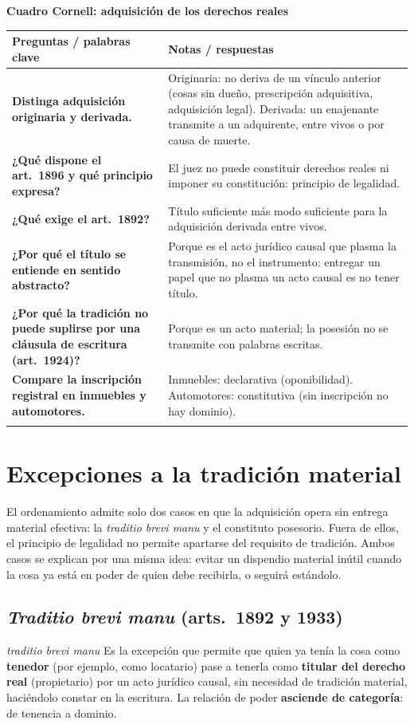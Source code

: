 \documentclass[12pt,oneside]{book}
\renewcommand{\arraystretch}{1.25}
\newcommand{\cq}[2]{\textbf{#1} & #2 \\[0.45em]}
\newcommand{\cornell}[3]{%
\par\bigskip\noindent\textbf{\large Cuadro Cornell: #1}\par\smallskip
\begin{center}
\small
\renewcommand{\arraystretch}{1.15}
\begin{tabularx}{\textwidth}{>{\raggedright\arraybackslash}p{0.27\textwidth}>{\raggedright\arraybackslash}X}
\toprule
\textbf{Preguntas / palabras clave} & \textbf{Notas / respuestas} \\
\midrule
#2
\midrule
\multicolumn{2}{p{\dimexpr\textwidth-2\tabcolsep\relax}}{\textbf{Resumen.} #3} \\
\bottomrule
\end{tabularx}
\end{center}
}
\begin{document}
\cornell{adquisición de los derechos reales}{
\cq{Distinga adquisición originaria y derivada.}{Originaria: no deriva de un vínculo anterior (cosas sin dueño, prescripción adquisitiva, adquisición legal). Derivada: un enajenante transmite a un adquirente, entre vivos o por causa de muerte.}
\cq{¿Qué dispone el art.~1896 y qué principio expresa?}{El juez no puede constituir derechos reales ni imponer su constitución: principio de legalidad.}
\cq{¿Qué exige el art.~1892?}{Título suficiente más modo suficiente para la adquisición derivada entre vivos.}
\cq{¿Por qué el título se entiende en sentido abstracto?}{Porque es el acto jurídico causal que plasma la transmisión, no el instrumento: entregar un papel que no plasma un acto causal es no tener título.}
\cq{¿Por qué la tradición no puede suplirse por una cláusula de escritura (art.~1924)?}{Porque es un acto material; la posesión no se transmite con palabras escritas.}
\cq{Compare la inscripción registral en inmuebles y automotores.}{Inmuebles: declarativa (oponibilidad). Automotores: constitutiva (sin inscripción no hay dominio).}
}{El derecho real se adquiere por vía originaria o derivada. En la derivada entre vivos rige la teoría del título y modo (art.~1892): acto jurídico causal válido más tradición material, que no puede suplirse por fórmulas escritas. La inscripción es declarativa en inmuebles y constitutiva en automotores.}

\chapter[Excepciones a la tradición material]{Excepciones a la tradición material}\label{cap:brevi}

El ordenamiento admite solo dos casos en que la adquisición opera sin entrega material efectiva: la \textit{traditio brevi manu} y el constituto posesorio. Fuera de ellos, el principio de legalidad no permite apartarse del requisito de tradición. Ambos casos se explican por una misma idea: evitar un dispendio material inútil cuando la cosa ya está en poder de quien debe recibirla, o seguirá estándolo.

\section{\textit{Traditio brevi manu} (arts.~1892 y 1933)}

\begin{definicion}{\textit{traditio brevi manu}}
Es la excepción que permite que quien ya tenía la cosa como \textbf{tenedor} (por ejemplo, como locatario) pase a tenerla como \textbf{titular del derecho real} (propietario) por un acto jurídico causal, sin necesidad de tradición material, haciéndolo constar en la escritura. La relación de poder \textbf{asciende de categoría}: de tenencia a dominio.
\end{definicion}
\end{document}
